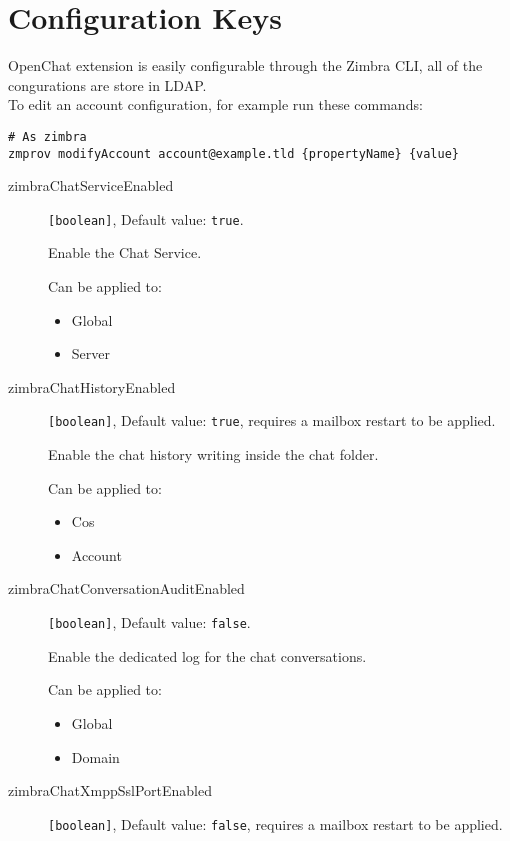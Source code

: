 \section{Configuration Keys}
\label{sect:confkeys}

OpenChat extension is easily configurable through the Zimbra CLI, all of the congurations are store in LDAP.\\

To edit an account configuration, for example run these commands:
\begin{verbatim}
# As zimbra
zmprov modifyAccount account@example.tld {propertyName} {value}
\end{verbatim}

\begin{description}
\item [zimbraChatServiceEnabled] \verb+[boolean]+, Default value: \verb+true+.

Enable the Chat Service.

Can be applied to:
\begin{itemize}
    \item Global
    \item Server
\end{itemize}

\item [zimbraChatHistoryEnabled] \verb+[boolean]+, Default value: \verb+true+, requires a mailbox restart to be applied.

Enable the chat history writing inside the chat folder.

Can be applied to:
\begin{itemize}
    \item Cos
    \item Account
\end{itemize}

\item [zimbraChatConversationAuditEnabled] \verb+[boolean]+, Default value: \verb+false+.

Enable the dedicated log for the chat conversations.

Can be applied to:
\begin{itemize}
    \item Global
    \item Domain
\end{itemize}

\item [zimbraChatXmppSslPortEnabled] \verb+[boolean]+, Default value: \verb+false+, requires a mailbox restart to be applied.


\end{description}
